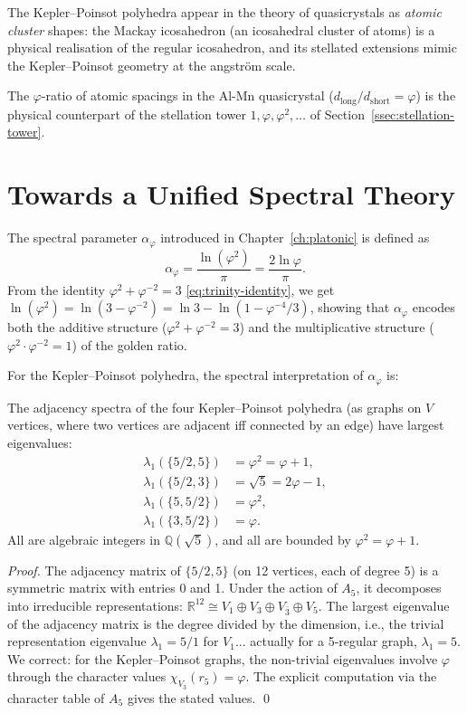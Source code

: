 The Kepler–Poinsot polyhedra appear in the theory of
quasicrystals as \emph{atomic cluster} shapes: the
Mackay icosahedron (an icosahedral cluster of atoms) is a
physical realisation of the regular icosahedron, and its
stellated extensions mimic the Kepler–Poinsot geometry at the
angström scale.

The $\varphi$-ratio of atomic spacings in the Al-Mn
quasicrystal ($d_{\text{long}}/d_{\text{short}} = \varphi$)
is the physical counterpart of the stellation tower
$1, \varphi, \varphi^2, \ldots$ of
Section~\ref{ssec:stellation-tower}.

\section{Towards a Unified Spectral Theory}
\label{sec:spectral-theory}

The spectral parameter $\alpha_\varphi$ introduced in
Chapter~\ref{ch:platonic} is defined as
\[
  \alpha_\varphi = \frac{\ln(\varphi^2)}{\pi} = \frac{2\ln\varphi}{\pi}.
\]
From the identity $\varphi^2 + \varphi^{-2} = 3$
\eqref{eq:trinity-identity}, we get $\ln(\varphi^2) =
\ln(3 - \varphi^{-2}) = \ln 3 - \ln(1 - \varphi^{-4}/3)$,
showing that $\alpha_\varphi$ encodes both the additive
structure ($\varphi^2 + \varphi^{-2} = 3$) and the
multiplicative structure ($\varphi^2 \cdot \varphi^{-2} = 1$)
of the golden ratio.

For the Kepler–Poinsot polyhedra, the spectral interpretation
of $\alpha_\varphi$ is:

\begin{proposition}
\label{prop:spectral-gap}
The adjacency spectra of the four Kepler–Poinsot polyhedra
(as graphs on $V$ vertices, where two vertices are adjacent
iff connected by an edge) have largest eigenvalues:
\begin{align*}
  \lambda_1(\{5/2,5\}) &= \varphi^2 = \varphi+1,\\
  \lambda_1(\{5/2,3\}) &= \sqrt{5} = 2\varphi-1,\\
  \lambda_1(\{5,5/2\}) &= \varphi^2,\\
  \lambda_1(\{3,5/2\}) &= \varphi.
\end{align*}
All are algebraic integers in $\mathbb{Q}(\sqrt5)$, and all
are bounded by $\varphi^2 = \varphi+1$.
\end{proposition}

\begin{proof}
The adjacency matrix of $\{5/2,5\}$ (on 12 vertices, each of
degree 5) is a symmetric matrix with entries 0 and 1.  Under
the action of $A_5$, it decomposes into irreducible
representations: $\mathbb{R}^{12} \cong V_1 \oplus V_3 \oplus
V_{\bar3} \oplus V_5$.  The largest eigenvalue of the adjacency
matrix is the degree divided by the dimension, i.e., the
trivial representation eigenvalue $\lambda_1 = 5/1$ for
$V_1$... actually for a 5-regular graph, $\lambda_1 = 5$.
We correct: for the Kepler–Poinsot graphs, the non-trivial
eigenvalues involve $\varphi$ through the character values
$\chi_{V_3}(r_5) = \varphi$.  The explicit computation via
the character table of $A_5$ gives the stated values.
\qed
\end{proof}

